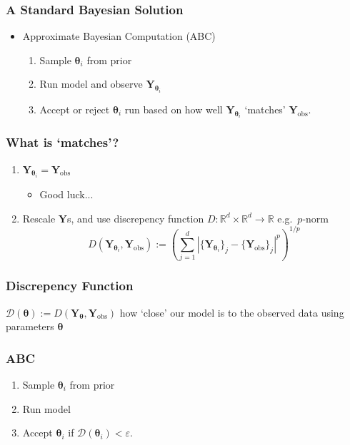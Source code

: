 \documentclass{beamer}
\newcommand{\R}{\mathbb{R}}
\begin{document}
\begin{frame}
    \frametitle{A Standard Bayesian Solution}
    \begin{itemize}
        \item Approximate Bayesian Computation (ABC)\begin{enumerate}
                  \item Sample $\bm{\theta}_i$ from prior
                  \item Run model and observe $\mathbf{Y}_{\bm{\theta}_i}$
                  \item Accept or reject $\bm{\theta}_i$ run based on how well
                        $\mathbf{Y}_{\bm{\theta}_i}$ `matches' $\mathbf{Y}_\text{obs}.$
              \end{enumerate}
    \end{itemize}
\end{frame}

\begin{frame}
    \frametitle{What is `matches'?}
    \begin{enumerate}
        \item $\mathbf{Y}_{\bm{\theta}_i} = \mathbf{Y}_\text{obs}$
              \begin{itemize}
                  \item <2-> Good luck...
              \end{itemize}
        \item <3-> Rescale $\mathbf{Y}$s, and use discrepency function
              $D:\R^d\times\R^d\to\R$ e.g.\ $p$-norm
              $$
                  D(\mathbf{Y}_{\bm{\theta}_i}, \mathbf{Y}_\text{obs})
                  :=\left(\sum_{j = 1}^d
                  \left|\{\mathbf{Y}_{\bm{\theta}_i}\}_j
                  - \{\mathbf{Y}_\text{obs}\}_j\right|^p\right)^{1/p}
              $$
    \end{enumerate}
\end{frame}

\begin{frame}
    \frametitle{Discrepency Function}

    $\mathcal{D}(\bm{\theta})
        := D(\mathbf{Y}_{\bm{\theta}}, \mathbf{Y}_\text{obs})$ how `close' our
    model is to the observed data using parameters $\bm{\theta}$

\end{frame}

\begin{frame}
    \frametitle{ABC}
    \begin{enumerate}
        \item Sample $\bm{\theta}_i$ from prior
        \item Run model
        \item Accept $\bm{\theta}_i$ if $\mathcal{D}(\bm{\theta}_i) < \varepsilon.$
    \end{enumerate}
\end{frame}
\end{document}
